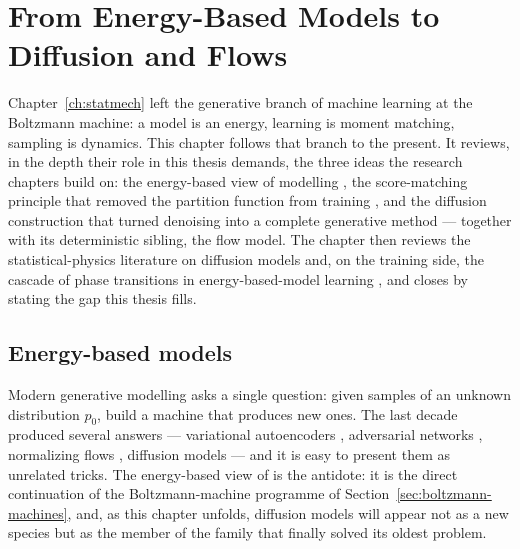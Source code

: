 \chapter{From Energy-Based Models to Diffusion and Flows}
\label{ch:diffusion}\label{ch:ebm}

Chapter~\ref{ch:statmech} left the generative branch of machine learning at
the Boltzmann machine: a model is an energy, learning is moment matching,
sampling is dynamics. This chapter follows that branch to the present. It
reviews, in the depth their role in this thesis demands, the three ideas the
research chapters build on: the energy-based view of modelling
\citep{lecun2006tutorial}, the score-matching principle that removed the
partition function from training
\citep{hyvarinen2005estimation, vincent2011connection}, and the diffusion
construction that turned denoising into a complete generative method
\citep{sohl2015deep, ho2020denoising, song2021scorebased} --- together with
its deterministic sibling, the flow model. The chapter then reviews the
statistical-physics literature on diffusion models
\citep{biroli2023generative, biroli2024dynamical, ghio2024sampling} and, on
the training side, the cascade of phase transitions in energy-based-model
learning \citep{bachtis2024cascade}, and closes by stating the gap this
thesis fills.

\section{Energy-based models}\label{sec:ebm-def}

Modern generative modelling asks a single question: given samples of an
unknown distribution $p_0$, build a machine that produces new ones. The
last decade produced several answers --- variational autoencoders
\citep{kingma2014auto}, adversarial networks \citep{goodfellow2014generative},
normalizing flows \citep{rezende2015variational}, diffusion models --- and
it is easy to present them as unrelated tricks. The energy-based view of
\citet{lecun2006tutorial} is the antidote: it is the direct continuation of
the Boltzmann-machine programme of Section~\ref{sec:boltzmann-machines},
and, as this chapter unfolds, diffusion models will appear not as a new
species but as the member of the family that finally solved its oldest
problem.

